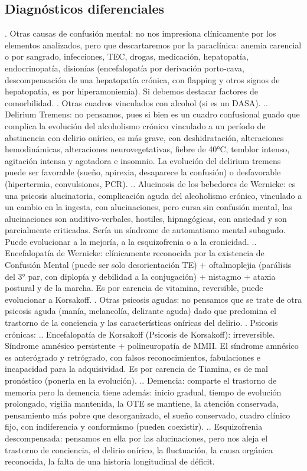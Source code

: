 \subsection*{Diagnósticos diferenciales}
. Otras causas de confusión mental: no nos impresiona clínicamente por los elementos analizados, pero que descartaremos por la paraclínica: anemia carencial o por sangrado, infecciones, TEC, drogas, medicación, hepatopatía, endocrinopatía, disionías (encefalopatía por derivación porto-cava, descompensación de una hepatopatía crónica, con flapping y otros signos de hepatopatía, es por hiperamoniemia). Si debemos destacar factores de comorbilidad.
. Otras cuadros vinculados con alcohol (si es un DASA).
.. Delirium Tremens: no pensamos, pues si bien es un cuadro confusional guado que complica la evolución del alcoholismo crónico vinculado a un período de abstinencia con delirio onírico, es más grave, con deshidratación, alteraciones hemodinámicas, alteraciones neurovegetativas, fiebre de 40°C, temblor intenso, agitación intensa y agotadora e insomnio. La evolución del delirium tremens puede ser favorable (sueño, apirexia, desaparece la confusión) o desfavorable (hipertermia, convulsiones, PCR).
.. Alucinosis de los bebedores de Wernicke: es una psicosis alucinatoria, complicación aguda del alcoholismo crónico, vinculado a un cambio en la ingesta, con alucinaciones, pero cursa sin confusión mental, las alucinaciones son auditivo-verbales, hostiles, hipnagógicas, con ansiedad y son parcialmente criticadas. Sería un síndrome de automatismo mental subagudo. Puede evolucionar a la mejoría, a la esquizofrenia o a la cronicidad.
.. Encefalopatía de Wernicke: clínicamente reconocida por la existencia de Confusión Mental (puede ser solo desorientación TE) + oftalmoplejia (parálisis del 3° par, con diplopía y debilidad a la conjugación) + nistagmo + ataxia postural y de la marcha. Es por carencia de vitamina, reversible, puede evolucionar a Korsakoff.
. Otras psicosis agudas: no pensamos que se trate de otra psicosis aguda (manía, melancolía, delirante aguda) dado que predomina el trastorno de la conciencia y las características oníricas del delirio.
. Psicosis crónicas:
.. Encefalopatía de Korsakoff (Psicosis de Korsakoff): irreversible. Síndrome amnésico persistente + polineuropatía de MMII. El síndrome amnésico es anterógrado y retrógrado, con falsos reconocimientos, fabulaciones e incapacidad para la adquisividad. Es por carencia de Tiamina, es de mal pronóstico (ponerla en la evolución).
.. Demencia: comparte el trastorno de memoria pero la demencia tiene además: inicio gradual, tiempo de evolución prolongado, vigilia mantenida, la OTE se mantiene, la atención conservada, pensamiento más pobre que desorganizado, el sueño conservado, cuadro clínico fijo, con indiferencia y conformismo (pueden coexistir).
.. Esquizofrenia descompensada: pensamos en ella por las alucinaciones, pero nos aleja el trastorno de conciencia, el delirio onírico, la fluctuación, la causa orgánica reconocida, la falta de una historia longitudinal de déficit.

